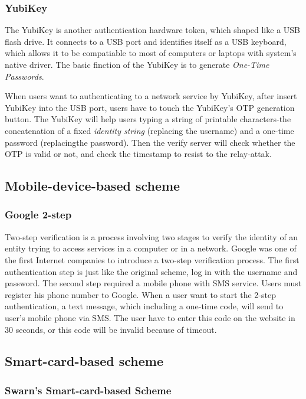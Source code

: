\begin{CJK}{Bg5}{bsmi}
\subsubsection{YubiKey}

The YubiKey is another authentication hardware token, which shaped like a USB flash drive. It connects to a USB port and identifies itself as a USB keyboard, which allows it to be compatiable to most of computers or laptops with system's native driver. The basic finction of the YubiKey is to generate \emph{One-Time Passwords}. 

When users want to authenticating to a network service by YubiKey, after insert YubiKey into the USB port, users have to touch the YubiKey's OTP generation button. The YubiKey will help users typing a string of printable characters-the concatenation of a fixed \emph{identity string} (replacing the username) and a one-time password (replacingthe password). Then the verify server will check whether the OTP is valid or not, and check the timestamp to resist to the relay-attak.

\subsection{Mobile-device-based scheme}

\subsubsection{Google 2-step}

Two-step verification is a process involving two stages to verify the identity of an entity trying to access services in a computer or in a network. Google was one of the first Internet companies to introduce a two-step verification process. The first authentication step is just like the original scheme, log in with the username and password. The second step required a mobile phone with SMS service. Users must register his phone number to Google. When a user want to start the 2-step authentication, a text message, which including a one-time code, will send to user's mobile phone via SMS. The user have to enter this code on the website in 30 seconds, or this code will be invalid because of timeout.

\subsection{Smart-card-based scheme}

\subsubsection{Swarn's Smart-card-based Scheme}

\end{CJK}